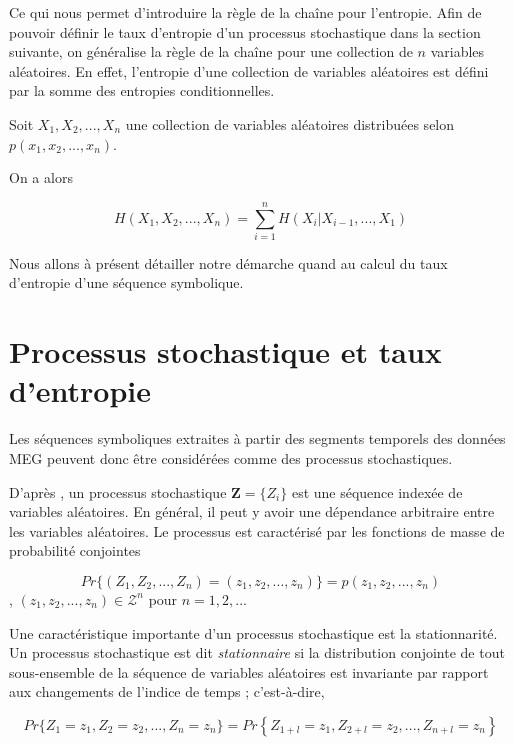 Ce qui nous permet d'introduire la règle de la chaîne pour l'entropie.
Afin de pouvoir définir le taux d'entropie d'un processus stochastique dans la section suivante, on généralise la règle de la chaîne pour une collection de $n$ variables aléatoires. En effet, l'entropie d'une collection de variables aléatoires est défini par la somme des entropies conditionnelles.

Soit $X_1, X_2, ...,X_n$ une collection de variables aléatoires distribuées selon $p(x_1, x_2, ...,x_n)$. 

\vspace{2ex}
On a alors

\begin{equation}
    H(X_1, X_2, ...,X_n)= \sum_{i=1}^{n}H(X_i|X_{i-1},...,X_1) \label{eq:chaine}
\end{equation}

\vspace{2ex}
Nous allons à présent détailler notre démarche quand au calcul du taux d'entropie d'une séquence symbolique.

\section{Processus stochastique et taux d'entropie}

Les séquences symboliques extraites à partir des segments temporels des données MEG peuvent donc être considérées comme des processus stochastiques.

D'après \cite{2}, un processus stochastique $\textbf{Z}=\{Z_i \}$ est une séquence indexée de variables aléatoires. En général, il peut y avoir une dépendance arbitraire entre les variables aléatoires. Le processus est caractérisé par les fonctions de masse de probabilité conjointes

\begin{equation}
    Pr\{(Z_1, Z_2, ...,Z_n)=(z_1, z_2, ...,z_n)\}=p(z_1, z_2, ...,z_n)
\end{equation},
$(z_1, z_2, ...,z_n) \in \mathcal{Z}^n$ pour $n=1,2,...$

\vspace{2ex}
Une caractéristique importante d'un processus stochastique est la stationnarité. Un processus stochastique est dit \textit{stationnaire} si la distribution conjointe de tout sous-ensemble de la séquence de variables aléatoires est invariante par rapport aux changements de l'indice de temps ; c'est-à-dire,

\begin{equation}
    Pr\{Z_1=z_1,Z_2=z_2,..., Z_n=z_n \} = Pr\left\{Z_{1+l}=z_1,Z_{2+l}=z_2,..., Z_{n+l}=z_n \right\}
\end{equation}

